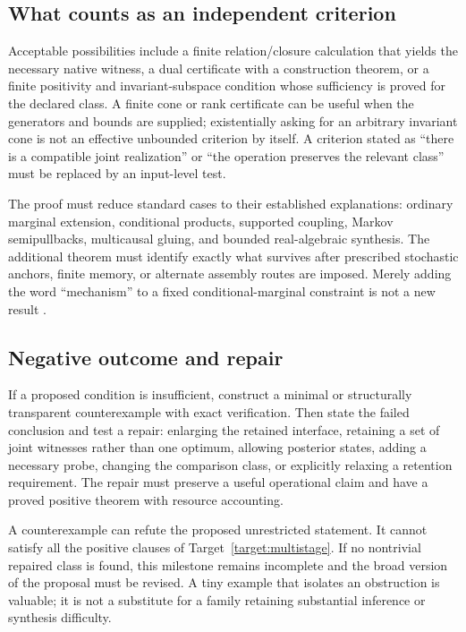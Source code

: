 \documentclass[11pt]{article}
\theoremstyle{remark}
\begin{document}
\subsection{What counts as an independent criterion}

Acceptable possibilities include a finite relation/closure calculation that yields the necessary native witness, a dual certificate with a construction theorem, or a finite positivity and invariant-subspace condition whose sufficiency is proved for the declared class. A finite cone or rank certificate can be useful when the generators and bounds are supplied; existentially asking for an arbitrary invariant cone is not an effective unbounded criterion by itself. A criterion stated as ``there is a compatible joint realization'' or ``the operation preserves the relevant class'' must be replaced by an input-level test.

The proof must reduce standard cases to their established explanations: ordinary marginal extension, conditional products, supported coupling, Markov semipullbacks, multicausal gluing, and bounded real-algebraic synthesis. The additional theorem must identify exactly what survives after prescribed stochastic anchors, finite memory, or alternate assembly routes are imposed. Merely adding the word ``mechanism'' to a fixed conditional-marginal constraint is not a new result \cite{Joint,Refinement,Multicausal}.

\subsection{Negative outcome and repair}

If a proposed condition is insufficient, construct a minimal or structurally transparent counterexample with exact verification. Then state the failed conclusion and test a repair: enlarging the retained interface, retaining a set of joint witnesses rather than one optimum, allowing posterior states, adding a necessary probe, changing the comparison class, or explicitly relaxing a retention requirement. The repair must preserve a useful operational claim and have a proved positive theorem with resource accounting.

A counterexample can refute the proposed unrestricted statement. It cannot satisfy all the positive clauses of Target~\ref{target:multistage}. If no nontrivial repaired class is found, this milestone remains incomplete and the broad version of the proposal must be revised. A tiny example that isolates an obstruction is valuable; it is not a substitute for a family retaining substantial inference or synthesis difficulty.
\end{document}
